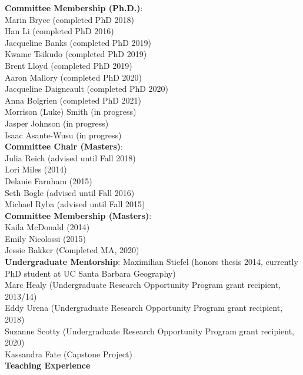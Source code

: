 \documentclass[11pt]{article} %
\begin{document}
\noindent
\textbf{Committee Membership (Ph.D.)}: \\
Marin Bryce (completed PhD 2018)\\
Han Li (completed PhD 2016)\\
Jacqueline Banks (completed PhD 2019)\\
Kwame Tsikudo (completed PhD 2019)\\
Brent Lloyd (completed PhD 2019)\\
Aaron Mallory (completed PhD 2020)\\
Jacqueline Daigneault (completed PhD 2020) \\
Anna Bolgrien (completed PhD 2021)\\
Morrison (Luke) Smith (in progress) \\
Jasper Johnson (in progress)\\
Isaac Asante-Wusu (in progress) \\

\noindent
\textbf{Committee Chair (Masters)}: \\
Julia Reich (advised until Fall 2018)\\
 Lori Miles (2014) \\
 Delanie Farnham (2015)\\
 Seth Bogle (advised until Fall 2016) \\
 Michael Ryba (advised until Fall 2015)\\


\noindent
\textbf{Committee Membership (Masters)}: \\
Kaila McDonald (2014)\\
Emily Nicolossi (2015) \\
Jessie Bakker (Completed MA, 2020)\\





\noindent
\textbf{Undergraduate Mentorship}:
 Maximilian Stiefel (honors thesis 2014, currently PhD student at UC Santa Barbara Geography)\\
 Marc Healy (Undergraduate Research Opportunity Program grant recipient, 2013/14)\\
 Eddy Urena (Undergraduate Research Opportunity Program grant recipient, 2018)\\
 Suzanne Scotty (Undergraduate Research Opportunity Program grant recipient, 2020)\\
 Kassandra Fate (Capstone Project)\\

\vspace{0.5cm}
\noindent
\textbf{Teaching Experience}
\end{document}
